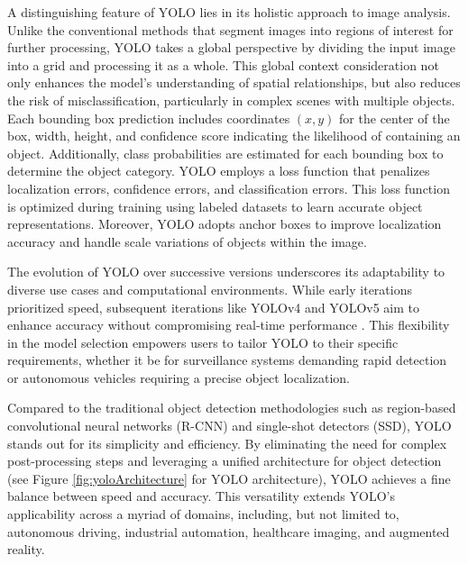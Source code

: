 A distinguishing feature of YOLO lies in its holistic approach to image analysis. Unlike the conventional methods that segment images into regions of interest for further processing, YOLO takes a global perspective by dividing the input image into a grid and processing it as a whole. This global context consideration not only enhances the model's understanding of spatial relationships, but also reduces the risk of misclassification, particularly in complex scenes with multiple objects. Each bounding box prediction includes coordinates $(x, y)$ for the center of the box, width, height, and confidence score indicating the likelihood of containing an object. Additionally, class probabilities are estimated for each bounding box to determine the object category. YOLO employs a loss function that penalizes localization errors, confidence errors, and classification errors.
This loss function is optimized during training using labeled datasets to learn accurate object representations. Moreover, YOLO adopts anchor boxes to improve localization accuracy and handle scale variations of objects within the image.

The evolution of YOLO over successive versions underscores its adaptability to diverse use cases and computational environments. While early iterations prioritized speed, subsequent iterations like YOLOv4 and YOLOv5 aim to enhance accuracy without compromising real-time performance \cite{YoloVersions2022}. This flexibility in the model selection empowers users to tailor YOLO to their specific requirements, whether it be for surveillance systems demanding rapid detection or autonomous vehicles requiring a precise object localization.

Compared to the traditional object detection methodologies such as region-based convolutional neural networks (R-CNN) \cite{MaskRCNN2017} and single-shot detectors (SSD), YOLO stands out for its simplicity and efficiency. By eliminating the need for complex post-processing steps and leveraging a unified architecture for object detection (see Figure \ref{fig:yoloArchitecture} for YOLO architecture), YOLO achieves a fine balance between speed and accuracy. This versatility extends YOLO's applicability across a myriad of domains, including, but not limited to, autonomous driving, industrial automation, healthcare imaging, and augmented reality.

